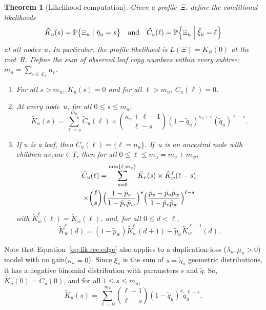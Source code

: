 \documentclass{elsarticle}
\newcommand{\condgen}[6]{{#1}#2 #5 #3 #6 #4}
\newcommand{\PROB}{\mathbb{P}}
\newcommand{\Probcsm}[2]{\condgen{\PROB}{\bigl\{}{\bigm|}{\bigr\}}{#1}{#2}}
\newcommand{\Probcmd}[2]{\condgen{\PROB}{\Bigl\{}{\Bigm|}{\Bigr\}}{#1}{#2}}
\newtheorem{theorem}{Theorem}
\newcommand{\nlik}{C}
\newcommand{\slik}{K}
\newcommand{\nx}{u}
\newcommand{\ny}{v}
\newcommand{\nz}{w}
\newcommand{\troot}{R}
\begin{document}
\begin{theorem}[Likelihood computation]\label{tm:lik.rec.finite}
Given a profile~$\Xi$, 
define the conditional likelihoods 
\[
\tilde{\slik}_{\nx}(s) = \Probcsm{\Xi_{\nx}}{\tilde{\eta}_{\nx}=s}
\quad\text{and}\quad 
\tilde{\nlik}_{\nx}(\ell) = \Probcmd{\Xi_{\nx}}{\tilde{\xi}_{\nx}=\ell}
\]
at all nodes~$\nx$. In particular, 
the profile likelihood is $L(\Xi)=\tilde{\slik}_{\troot} (0)$ 
at the root~$R$. Define the sum of observed leaf copy numbers 
within every subtree:
$
m_{\nx} = \sum_{\ny\in \mathcal{L}_{\nx}} n_{\ny}
$.
\begin{enumerate}[label=(\roman*)]
\item  For all $s>m_{\nx}$, $\tilde{\slik}_{\nx}(s)=0$ 
 and for all $\ell>m_{\nx}$, $\tilde{\nlik}_{\nx}(\ell)=0$. 
\item  At every node~$\nx$, for all $0\le s\le m_{\nx}$, 
\begin{equation}\label{eq:lik.rec.edge}
\tilde{\slik}_{\nx}(s) 
= \sum_{\ell= s}^{m_{\nx}}
	\tilde{\nlik}_{\nx}(\ell)	
	\times
	\binom{\kappa_{\nx}+\ell-1}{\ell-s} (1-\tilde{q}_{\nx})^{\kappa_{\nx}+s} (\tilde{q}_{\nx})^{\ell-s}.
\end{equation}
\item If $\nx$ is a leaf, then $\tilde{\nlik}_{\nx}(\ell) = \{\ell=n_{\nx}\}$. 
If~$\nx$ is an ancestral node with children $\nx\ny,\nx\nz\in T$, then 
for all $0\le \ell \le m_{\nx}=m_{\ny}+m_{\nz}$, 
\begin{multline}\label{eq:lik.rec.node}
\tilde{\nlik}_{\nx}(\ell)
 = \sum_{s=0}^{\min\{\ell,m_{\ny}\}} 
 		\tilde{\slik}_{\ny}(s) 
 		\times \tilde{\slik}^{\ell}_{\nz}(\ell-s)
 		\\
 		\times \binom{\ell}{s} \Bigl(\frac{1-\tilde{p}_{\ny}}{1-\tilde{p}_{\ny}\tilde{p}_{\nz}}\Bigr)^s
 		 \Bigl(\frac{\tilde{p}_{\ny} -\tilde{p}_{\ny} \tilde{p}_{\nz}}{1-\tilde{p}_{\ny}\tilde{p}_{\nz}}\Bigr)^{\ell-s} 		
\end{multline}
with $
\tilde{\slik}_{\nz}^{\ell}(\ell)=\tilde{\slik}_{\nz}(\ell)
$, and, for all $0\le d< \ell$,  
\begin{equation}
\tilde{\slik}^{\ell}_{\nz}(d)= (1-\tilde{p}_{\nz}) \tilde{\slik}^{\ell}_{\nz}(d+1) 
		+ \tilde{p}_{\nz} \tilde{\slik}^{\ell-1}_{\nz}(d). 
\end{equation}
\end{enumerate}
\end{theorem}
Note that Equation~\eqref{eq:lik.rec.edge} also applies to 
a duplication-loss ($\lambda_{\nx},\mu_{\nx}>0$) model with no gain($\kappa_{\nx}=0$). Since
$\tilde{\xi}_{\nx}$ is the sum of $s=\tilde{\eta}_{\nx}$ geometric distributions, 
it has a negative binomial distribution with parameters $s$ and $\tilde{q}$. 
So,  
$\tilde{\slik}_{\nx}(0) = \tilde{\nlik}_{\nx}(0)$, and for all
$1\le s\le m_{\nx}$,
\[
\tilde{\slik}_{\nx}(s) = \sum_{\ell=0}^{m_{\nx}}
	\binom{\ell-1}{\ell-s}
		(1-\tilde{q}_{\nx})^{s} \tilde{q}_{\nx}^{\ell-s}. 
\]
\end{document}
